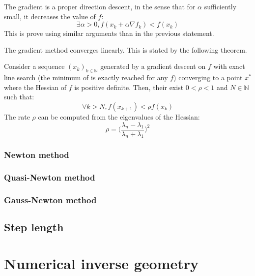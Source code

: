 \documentclass{book}
\begin{document}
The gradient is a proper direction descent, in the sense that for $\alpha$ sufficiently small, it decreases the value of $f$:
\[ \exists \alpha>0, f(x_k+\alpha \nabla f_k) < f(x_k) \]
This is prove using similar arguments than in the previous statement.

The gradient method converges linearly. This is stated by the following theorem.
\begin{theorem}
Consider a sequence $(x_k)_{k\in\mathbb{N}}$ generated by a gradient descent on $f$ with exact line search (\mie the minimum of  is exactly reached for any $f$) converging to a point $x^*$ where the Hessian of $f$ is positive definite. Then, their exist $0<\rho<1$ and $N\in\mathbb{N}$ such that:\[ \forall k>N, f(x_{k+1}) < \rho f(x_k) \]
The rate $\rho$ can be computed from the eigenvalues of the Hessian:
\[ \rho = \Big( \frac{\lambda_n - \lambda_1}{\lambda_n + \lambda_1} \Big)^2 \]
\end{theorem}


\subsubsection{Newton method}

\subsubsection{Quasi-Newton method}

\subsubsection{Gauss-Newton method}


\subsection{Step length}


\section{Numerical inverse geometry}\label{sec:numinvgeom}

\end{document}
